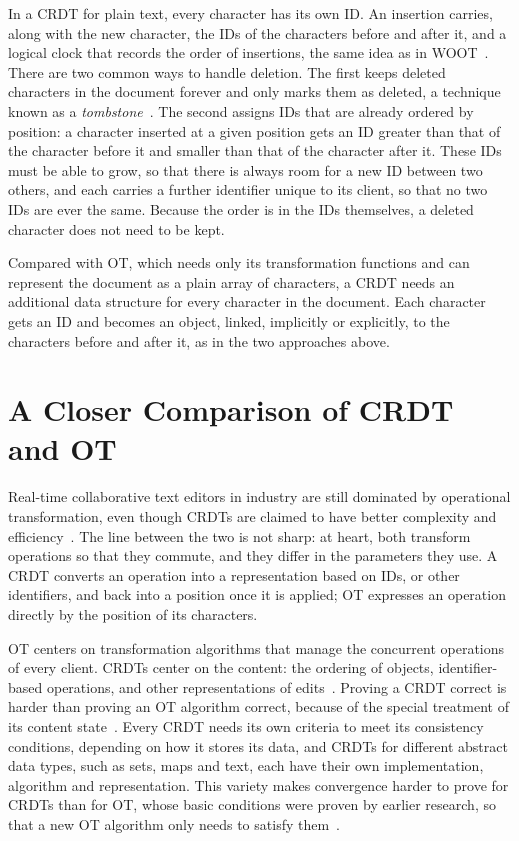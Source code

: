 In a CRDT for plain text, every character has its own ID. An insertion carries, along with the new character, the IDs of the characters before and after it, and a logical clock that records the order of insertions, the same idea as in WOOT~\citep{oster2005real}. There are two common ways to handle deletion. The first keeps deleted characters in the document forever and only marks them as deleted, a technique known as a \emph{tombstone}~\citep{molli2006tombstone}. The second assigns IDs that are already ordered by position: a character inserted at a given position gets an ID greater than that of the character before it and smaller than that of the character after it. These IDs must be able to grow, so that there is always room for a new ID between two others, and each carries a further identifier unique to its client, so that no two IDs are ever the same. Because the order is in the IDs themselves, a deleted character does not need to be kept.

Compared with OT, which needs only its transformation functions and can represent the document as a plain array of characters, a CRDT needs an additional data structure for every character in the document. Each character gets an ID and becomes an object, linked, implicitly or explicitly, to the characters before and after it, as in the two approaches above.

\section{A Closer Comparison of CRDT and OT}
\label{sec:perbandingan}

Real-time collaborative text editors in industry are still dominated by operational transformation, even though CRDTs are claimed to have better complexity and efficiency~\citep{Sun2019third}. The line between the two is not sharp: at heart, both transform operations so that they commute, and they differ in the parameters they use. A CRDT converts an operation into a representation based on IDs, or other identifiers, and back into a position once it is applied; OT expresses an operation directly by the position of its characters.

OT centers on transformation algorithms that manage the concurrent operations of every client. CRDTs center on the content: the ordering of objects, identifier-based operations, and other representations of edits~\citep{Sun2019Second, Sun2019First}. Proving a CRDT correct is harder than proving an OT algorithm correct, because of the special treatment of its content state~\citep{Sun2019Second}. Every CRDT needs its own criteria to meet its consistency conditions, depending on how it stores its data, and CRDTs for different abstract data types, such as sets, maps and text, each have their own implementation, algorithm and representation. This variety makes convergence harder to prove for CRDTs than for OT, whose basic conditions were proven by earlier research, so that a new OT algorithm only needs to satisfy them~\citep{OTOverview1, Sun2004, oster2005real}.

